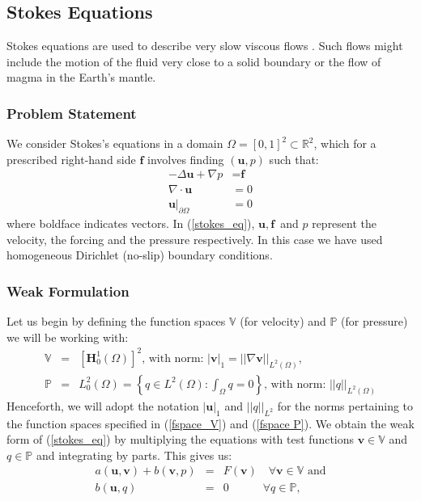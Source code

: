 \documentclass[12pt,a4paper]{article}
\theoremstyle{definition}
\begin{document}
\subsection{Stokes Equations}
Stokes equations are used to describe very slow viscous flows .  Such flows might include the motion of the fluid very close to a solid boundary or the flow of magma in the Earth's mantle.  
\subsubsection{Problem Statement}
We consider Stokes's equations in a domain $\Omega = \left[0,1\right]^2 \subset \mathbb{R}^2$, which for a prescribed right-hand side $\textbf{f}$ involves finding $\left(\textbf{u},p\right)$ such that:
\begin{equation}\label{stokes_eq}
\begin{aligned}
	-\Delta\textbf{u} + \nabla p &= \textbf{f} \\ 
	\nabla\cdot \textbf{u}&= 0\\ 
\textbf{u}|_{\partial\Omega}&=0 
\end{aligned}
\end{equation}
where boldface indicates vectors.  In (\ref{stokes_eq}), $\textbf{u},\, \textbf{f}$ and $p$ represent the velocity, the forcing and the pressure respectively.  In this case we have used homogeneous Dirichlet (no-slip) boundary conditions. 
\subsubsection{Weak Formulation}\label{weak-form-stokes}

Let us begin by defining the  function spaces $\mathbb{V}$ (for velocity) and $\mathbb{P}$ (for pressure) we will be working with:
\begin{eqnarray}\label{fspace_V}
\mathbb{V}&=&\left[\textbf{H}^1_0\left(\Omega\right)\right]^2\text{, with norm: } \left|\textbf{v}\right|_{1}=\left|\left|\nabla\textbf{v}\right|\right|_{L^2\left(\Omega\right)}, \\\label{fspace P}
\mathbb{P}&=&L^2_0\left(\Omega\right)=\left\lbrace q\in L^2\left(\Omega\right): \int_\Omega q=0\right\rbrace\text{, with norm: } \left|\left|q\right|\right|_{L^2\left(\Omega\right)}
\end{eqnarray}
 Henceforth, we will adopt the notation $\left|\textbf{u}\right|_1$ and $\left|\left|q\right|\right|_{L^2}$ for the norms pertaining to the function spaces specified in (\ref{fspace_V}) and (\ref{fspace P}).  
We obtain the weak form of (\ref{stokes_eq}) by multiplying the equations with test functions $\textbf{v}\in \mathbb{V}$ and $q\in\mathbb{P}$ and integrating by parts.  This gives us:
\begin{eqnarray}\label{form-a}
a\left(\textbf{u},\textbf{v}\right) + b\left(\textbf{v},p\right) &=& F\left(\textbf{v}\right)\quad \forall 
\textbf{v} \in \mathbb{V} \text{ and} \\ \label{form-b}
b\left(\textbf{u},q\right)&=&0 \quad \quad\quad\forall q \in \mathbb{P},
\end{eqnarray}
\end{document}
